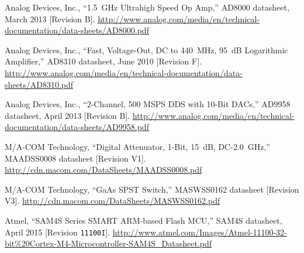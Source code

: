 \renewcommand{\bibsection}{%
    \chapter{\bibname}
    \prebibhook}
\begin{thebibliography}{9}

%
%
Analog Devices, Inc., ``1.5~GHz Ultrahigh Speed Op Amp,'' AD8000 datasheet,
March 2013 [Revision B].
\url{http://www.analog.com/media/en/technical-documentation/data-sheets/AD8000.pdf}

Analog Devices, Inc., ``Fast, Voltage-Out, DC to 440~MHz, 95~dB Logarithmic Amplifier,''
AD8310 datasheet, June 2010 [Revision F].
\url{http://www.analog.com/media/en/technical-documentation/data-sheets/AD8310.pdf}

Analog Devices, Inc., ``2-Channel, 500 MSPS DDS with 10-Bit DACs,'' AD9958 datasheet,
April 2013 [Revision B].
\url{http://www.analog.com/media/cn/technical-documentation/data-sheets/AD9958.pdf}

%
%
M/A-COM Technology, ``Digital Attenuator, 1-Bit, 15~dB, DC-2.0~GHz,'' MAADSS0008 datasheet [Revision V1].
\url{http://cdn.macom.com/DataSheets/MAADSS0008.pdf}

M/A-COM Technology, ``GaAs SPST Switch,'' MASWSS0162 datasheet [Revision V3].
\url{http://cdn.macom.com/DataSheets/MASWSS0162.pdf}

%
%
%
Atmel, ``SAM4S Series SMART ARM-based Flash MCU,'' SAM4S datasheet, April 2015 [Revision \texttt{11100I}].
\url{http://www.atmel.com/Images/Atmel-11100-32-bit%20Cortex-M4-Microcontroller-SAM4S_Datasheet.pdf}


\end{thebibliography}
